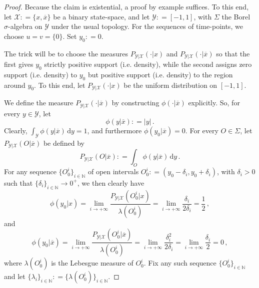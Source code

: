 \documentclass[twoside,11pt]{article}
\newcommand{\nats}{\mathbb{N}}
\newcommand{\states}{\mathcal{X}}
\newcommand{\observs}{\mathcal{Y}}
\newcommand{\abs}[1]{\left\vert #1 \right\vert}
\newcommand{\coloneqq}{:\!=}
\begin{document}
\begin{proof}
Because the claim is existential, a proof by example suffices. To this end, let $\states\coloneqq\{x,\overline{x}\}$ be a binary state-space, and let $\observs\coloneqq [-1,1]$, with $\Sigma$ the Borel $\sigma$-algebra on $\observs$ under the usual topology. For the sequences of time-points, we choose $u=v=\{0\}$. Set $y_0\coloneqq 0$.

The trick will be to choose the measures $P_{\observs\vert\states}(\cdot\vert x)$ and $P_{\observs\vert\states}(\cdot\vert \overline{x})$ so that the first gives $y_0$ strictly positive support (i.e. density), while the second assigns zero support (i.e. density) to $y_0$ but positive support (i.e. density) to the region around $y_0$. To this end, let $P_{\observs\vert\states}(\cdot\vert x)$ be the uniform distribution on $[-1,1]$.

We define the measure $P_{\observs\vert\states}(\cdot\vert \overline{x})$ by constructing $\phi(\cdot\vert\overline{x})$ explicitly. So, for every $y\in\observs$, let
\begin{equation*}
\phi(y\vert\overline{x}) \coloneqq \abs{y}\,.
\end{equation*}
Clearly, $\int_\observs \phi(y\vert\overline{x})\,\mathrm{d}y = 1$, and furthermore $\phi(y_0\vert\overline{x})=0$. For every $O\in\Sigma$, let $P_{\observs\vert\states}(O\vert\overline{x})$ be defined by
\begin{equation*}
P_{\observs\vert\states}(O\vert\overline{x}) \coloneqq \int_O\phi(y\vert\overline{x})\,\mathrm{d}y\,.
\end{equation*}
For any sequence $\{O_0^i\}_{i\in\nats}$ of open intervals $O_0^i\coloneqq (y_0-\delta_i,y_0+\delta_i)$, with $\delta_i>0$ such that $\{\delta_i\}_{i\in\nats}\to0^+$, we then clearly have
\begin{equation*}
\phi(y_0\vert x) = \lim_{i\to+\infty} \frac{P_{\observs\vert\states}(O_0^i\vert x)}{\lambda(O_0^i)} = \lim_{i\to+\infty} \frac{\delta_i}{2\delta_i} = \frac{1}{2}\,,
\end{equation*}
and
\begin{equation*}
\phi(y_0\vert \overline{x}) = \lim_{i\to+\infty} \frac{P_{\observs\vert\states}(O_0^i\vert \overline{x})}{\lambda(O_0^i)} = \lim_{i\to+\infty} \frac{\delta_i^2}{2\delta_i} = \lim_{i\to+\infty} \frac{\delta_i}{2} = 0\,,
\end{equation*}
where $\lambda(O_0^i)$ is the Lebesgue measure of $O_0^i$. Fix any such sequence $\{O_0^i\}_{i\in\nats}$ and let $\{\lambda_i\}_{i\in\nats}\coloneqq\{\lambda(O_0^i)\}_{i\in\nats}$.%


\end{proof}
\end{document}
